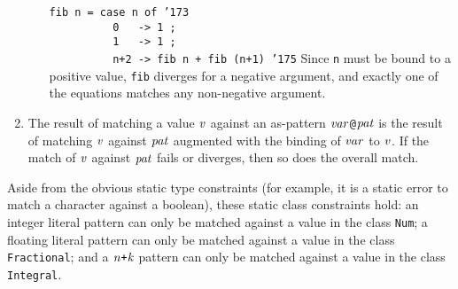 \begin{enumerate}
\begin{enumerate}
\bprog
\mbox{\tt fib\ n\ =\ case\ n\ of\ {\char'173}}\\
\mbox{\tt \ \ \ \ \ \ \ \ \ \ 0\ \ \ ->\ 1\ ;}\\
\mbox{\tt \ \ \ \ \ \ \ \ \ \ 1\ \ \ ->\ 1\ ;}\\
\mbox{\tt \ \ \ \ \ \ \ \ \ \ n+2\ ->\ fib\ n\ +\ fib\ (n+1)\ {\char'175}}
\eprog
Since \mbox{\tt n} must be bound to a positive value, \mbox{\tt fib} diverges for a
negative argument, and exactly one of the equations matches any
non-negative argument.
\end{enumerate}

\item
The result of matching a value \mbox{$\it v$} against an as-pattern \mbox{$\it var$}{\tt @}\mbox{$\it pat$} is
the result of matching \mbox{$\it v$} against \mbox{$\it pat$} augmented with the binding of
\mbox{$\it var$} to \mbox{$\it v$}.  If the match of \mbox{$\it v$} against \mbox{$\it pat$} fails or diverges,
then so does the overall match.
\end{enumerate}

Aside from the obvious static type constraints (for
example, it is a static error to match a character against a
boolean), these static class constraints hold: an integer
literal pattern
can only be matched against a value in the class
\mbox{\tt Num}; a floating literal pattern
can only be matched against a value
in the class \mbox{\tt Fractional}; and a \mbox{$\it n\makebox{\tt +}k$} pattern
can only be matched
against a value in the class \mbox{\tt Integral}.

